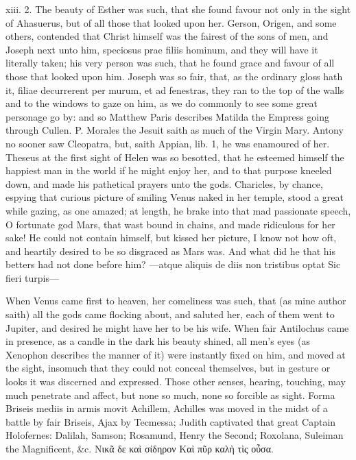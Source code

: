 {xiii. 2. The beauty of Esther was such, that she found favour not only
in the sight of Ahasuerus, but of all those that looked upon her.
Gerson, Origen, and some others, contended that Christ himself was the
fairest of the sons of men, and Joseph next unto him, speciosus prae
filiis hominum, and they will have it literally taken; his very person
was such, that he found grace and favour of all those that looked upon
him. Joseph was so fair, that, as the ordinary gloss hath it, filiae
decurrerent per murum, et ad fenestras, they ran to the top of the
walls and to the windows to gaze on him, as we do commonly to see some
great personage go by: and so Matthew Paris describes Matilda the
Empress going through Cullen. P. Morales the Jesuit saith as much
of the Virgin Mary. Antony no sooner saw Cleopatra, but, saith Appian,
lib. 1, he was enamoured of her. Theseus at the first sight of
Helen was so besotted, that he esteemed himself the happiest man in the
world if he might enjoy her, and to that purpose kneeled down, and made
his pathetical prayers unto the gods. Charicles, by chance,
espying that curious picture of smiling Venus naked in her temple,
stood a great while gazing, as one amazed; at length, he brake into
that mad passionate speech, O fortunate god Mars, that wast bound in
chains, and made ridiculous for her sake! He could not contain himself,
but kissed her picture, I know not how oft, and heartily desired to be
so disgraced as Mars was. And what did he that his betters had not done
before him?
---atque aliquis de diis non tristibus optat
Sic fieri turpis---

When Venus came first to heaven, her comeliness was such, that (as mine
author saith) all the gods came flocking about, and saluted her,
each of them went to Jupiter, and desired he might have her to be his
wife. When fair Antilochus came in presence, as a candle in the
dark his beauty shined, all men's eyes (as Xenophon describes the
manner of it) were instantly fixed on him, and moved at the sight,
insomuch that they could not conceal themselves, but in gesture or
looks it was discerned and expressed. Those other senses, hearing,
touching, may much penetrate and affect, but none so much, none so
forcible as sight. Forma Briseis mediis in armis movit Achillem,
Achilles was moved in the midst of a battle by fair Briseis, Ajax by
Tecmessa; Judith captivated that great Captain Holofernes: Dalilah,
Samson; Rosamund, Henry the Second; Roxolana, Suleiman the
Magnificent, \&c.
Νικᾶ δε καὶ σίδηρον
Καὶ πῦρ καλὴ τὶς οὖσα.

}
